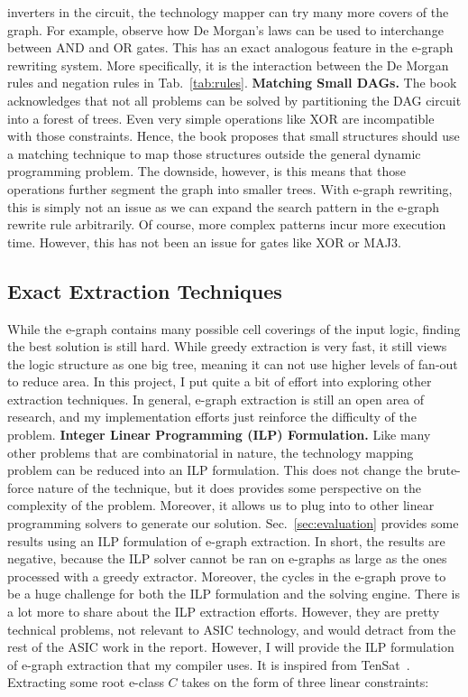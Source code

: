 \documentclass[10pt,letterpaper]{article}
\begin{document}
inverters in the circuit, the technology mapper can try many more covers of the
graph. For example, observe how De Morgan's laws can be used to interchange
between AND and OR gates. This has an exact analogous feature in the e-graph
rewriting system. More specifically, it is the interaction between the De
Morgan rules and negation rules in Tab.~\ref{tab:rules}. \bigbreak{} \noindent
\textbf{Matching Small DAGs.} The book acknowledges that not all problems can
be solved by partitioning the DAG circuit into a forest of trees. Even very
simple operations like XOR are incompatible with those constraints. Hence, the
book proposes that small structures should use a matching technique to map
those structures outside the general dynamic programming problem. The downside,
however, is this means that those operations further segment the graph into
smaller trees. With e-graph rewriting, this is simply not an issue as we can
expand the search pattern in the e-graph rewrite rule arbitrarily. Of course,
more complex patterns incur more execution time. However, this has not been an
issue for gates like XOR or MAJ3.

\subsection{Exact Extraction Techniques}\label{sec:alt:extraction}

While the e-graph contains many possible cell coverings of the input logic,
finding the best solution is still hard. While greedy extraction is very fast,
it still views the logic structure as one big tree, meaning it can not use
higher levels of fan-out to reduce area. In this project, I put quite a bit of
effort into exploring other extraction techniques. In general, e-graph
extraction is still an open area of research, and my implementation efforts
just reinforce the difficulty of the problem. \bigbreak{} \noindent
\textbf{Integer Linear Programming (ILP) Formulation.} Like many other problems
that are combinatorial in nature, the technology mapping problem can be reduced
into an ILP formulation. This does not change the brute-force nature of the
technique, but it does provides some perspective on the complexity of the
problem. Moreover, it allows us to plug into to other linear programming
solvers to generate our solution. Sec.~\ref{sec:evaluation} provides some
results using an ILP formulation of e-graph extraction. In short, the results
are negative, because the ILP solver cannot be ran on e-graphs as large as the
ones processed with a greedy extractor. Moreover, the cycles in the e-graph
prove to be a huge challenge for both the ILP formulation and the solving
engine. There is a lot more to share about the ILP extraction efforts. However,
they are pretty technical problems, not relevant to ASIC technology, and would
detract from the rest of the ASIC work in the report. However, I will provide
the ILP formulation of e-graph extraction that my compiler uses. It is inspired
from TenSat~\cite{ilpextract}. Extracting some root e-class $C$ takes on the
form of three linear constraints:
\end{document}

